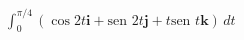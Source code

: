 \item $\int_0^{\pi/4} (\cos 2t \mathbf{i} + \text{sen } 2t \mathbf{j} + t \text{sen } t \mathbf{k}) \, dt$
